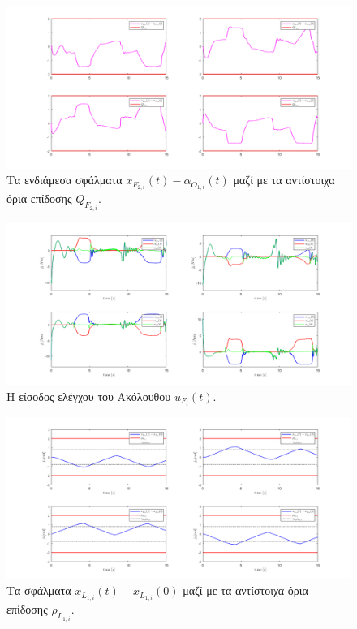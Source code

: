 \begin{figure}[H]
    \centering
    \includegraphics[width=1\linewidth]{Chapters/Chapter3/Figures/Sim1Fig5.png}
    \caption{Τα ενδιάμεσα σφάλματα $x_{F_{2,i}}(t) - \alpha_{O_{1,i}}(t)$ μαζί με τα αντίστοιχα όρια επίδοσης $Q_{F_{2,i}}$.}
    \label{Sim1Fig5}
\end{figure}



\begin{figure}[H]
    \centering
    \includegraphics[width=1\linewidth]{Chapters/Chapter3/Figures/Sim1Fig6.png}
    \caption{Η είσοδος ελέγχου του Ακόλουθου $u_{F_{i}}(t)$.}
    \label{Sim1Fig6}
\end{figure}

\begin{figure}[H]
    \centering
    \includegraphics[width=1\linewidth]{Chapters/Chapter3/Figures/Sim1Fig7.png}
    \caption{Τα σφάλματα $x_{L_{1,i}}(t) - x_{L_{1,i}}(0)$ μαζί με τα αντίστοιχα όρια επίδοσης $\rho_{L_{1,i}}$.}
    \label{Sim1Fig7}
\end{figure}



